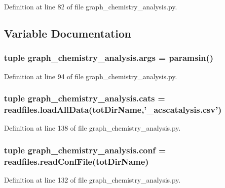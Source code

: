 Definition at line 82 of file graph\-\_\-chemistry\-\_\-analysis.\-py.



\subsection{Variable Documentation}
\hypertarget{a00103_a56a89c268db9387680d2afc8d00af322}{
\subsubsection[{args}]{\setlength{\rightskip}{0pt plus 5cm}tuple graph\-\_\-chemistry\-\_\-analysis.\-args = {\bf paramsin}()}}\label{a00103_a56a89c268db9387680d2afc8d00af322}


Definition at line 94 of file graph\-\_\-chemistry\-\_\-analysis.\-py.

\hypertarget{a00103_a2598a91c3cafd8b33e22408f492d6a25}{
\subsubsection[{cats}]{\setlength{\rightskip}{0pt plus 5cm}tuple graph\-\_\-chemistry\-\_\-analysis.\-cats = readfiles.\-load\-All\-Data({\bf tot\-Dir\-Name},'\-\_\-acscatalysis.\-csv')}}\label{a00103_a2598a91c3cafd8b33e22408f492d6a25}


Definition at line 138 of file graph\-\_\-chemistry\-\_\-analysis.\-py.

\hypertarget{a00103_a428d5f80473d901d21779f75ec4a7495}{
\subsubsection[{conf}]{\setlength{\rightskip}{0pt plus 5cm}tuple graph\-\_\-chemistry\-\_\-analysis.\-conf = readfiles.\-read\-Conf\-File({\bf tot\-Dir\-Name})}}\label{a00103_a428d5f80473d901d21779f75ec4a7495}


Definition at line 132 of file graph\-\_\-chemistry\-\_\-analysis.\-py.

